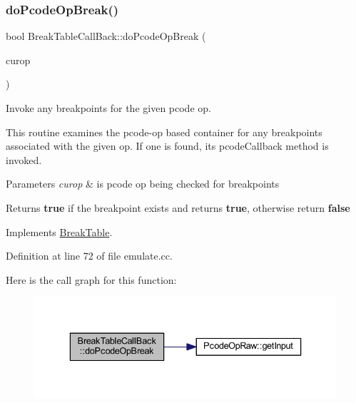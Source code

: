 \subsubsection{\texorpdfstring{doPcodeOpBreak()}{doPcodeOpBreak()}}
{\footnotesize\ttfamily bool Break\+Table\+Call\+Back\+::do\+Pcode\+Op\+Break (\begin{DoxyParamCaption}\item[{\mbox{\hyperlink{class_pcode_op_raw}{Pcode\+Op\+Raw}} $\ast$}]{curop }\end{DoxyParamCaption})\hspace{0.3cm}{\ttfamily [virtual]}}



Invoke any breakpoints for the given pcode op. 

This routine examines the pcode-\/op based container for any breakpoints associated with the given op. If one is found, its pcode\+Callback method is invoked. 
\begin{DoxyParams}{Parameters}
{\em curop} & is pcode op being checked for breakpoints \\
\hline
\end{DoxyParams}
\begin{DoxyReturn}{Returns}
{\bfseries{true}} if the breakpoint exists and returns {\bfseries{true}}, otherwise return {\bfseries{false}} 
\end{DoxyReturn}


Implements \mbox{\hyperlink{class_break_table_af8829327f29c768f834825fe40b54bad}{Break\+Table}}.



Definition at line 72 of file emulate.\+cc.

Here is the call graph for this function\+:
\nopagebreak
\begin{figure}[H]
\begin{center}
\leavevmode
\includegraphics[width=336pt]{class_break_table_call_back_a16b989de8c0b55d15940ac41bf7cdd73_cgraph}
\end{center}
\end{figure}
\mbox{\label{class_break_table_call_back_a22f1cb661549be082a71edcca5eb7f5f}} 

